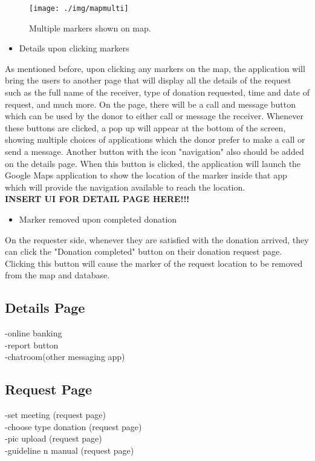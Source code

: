 \documentclass[conference]{IEEEtran}
\begin{document}
\begin{figure}[h!]
\texttt{[image: ./img/mapmulti]}
\centering
\caption{Multiple markers shown on map.}
\end{figure}
\begin{itemize}
\item Details upon clicking markers
\end{itemize}
\par As mentioned before, upon clicking any markers on the map, the application will bring the users to another page that will display all the details of the request such as the full name of the receiver, type of donation requested, time and date of request, and much more. On the page, there will be a call and message button which can be used by the donor to either call or message the receiver. Whenever these buttons are clicked, a pop up will appear at the bottom of the screen, showing multiple choices of applications which the donor prefer to make a call or send a message. Another button with the icon "navigation" also should be added on the details page. When this button is clicked, the application will launch the Google Maps application to show the location of the marker inside that app which will provide the navigation available to reach the location.\\

\textbf{INSERT UI FOR DETAIL PAGE HERE!!!}\\

\begin{itemize}
\item Marker removed upon completed donation
\end{itemize}
\par On the requester side, whenever they are satisfied with the donation arrived, they can click the "Donation completed" button on their donation request page. Clicking this button will cause the marker of the request location to be removed from the map and database.\\

\subsection{Details Page}
-online banking\\
-report button\\
-chatroom(other messaging app)\\

\subsection{Request Page}
-set meeting (request page)\\
-choose type donation (request page)\\
-pic upload (request page)\\
-guideline n manual (request page)\\
\end{document}
